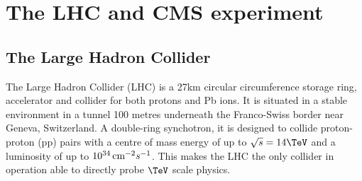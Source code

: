 
\chapter{The LHC and CMS experiment} %
\label{cha:detector}
\section{The Large Hadron Collider}
\label{lhc_intro}
The Large Hadron Collider (LHC) is a 27km circular circumference storage ring, accelerator and collider for 
both protons and Pb ions. It is situated in a stable environment in a tunnel 
100 metres underneath the Franco-Swiss border near Geneva, Switzerland.
A double-ring synchotron, it is designed to collide proton-proton (pp)
pairs with a centre of mass energy of up to $\sqrt{s}=14\TeV$ and a 
luminosity of up to $10^{34}\,\text{cm}^{-2}s^{-1}$. This makes the LHC the only collider
in operation able to directly probe $\TeV$ scale physics. 

